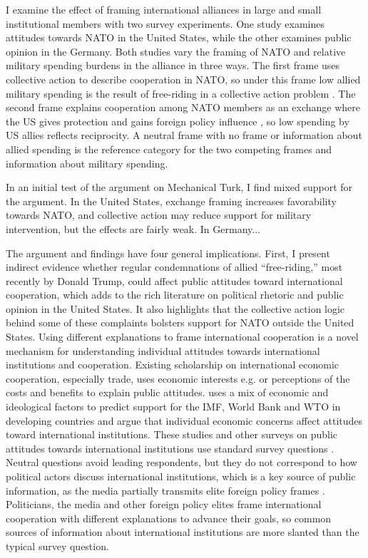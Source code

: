 \documentclass[12pt]{article}
\begin{document}
I examine the effect of framing international alliances in large and small institutional members with two survey experiments. 
One study examines attitudes towards NATO in the United States, while the other examines public opinion in the Germany. 
Both studies vary the framing of NATO and relative military spending burdens in the alliance in three ways. 
The first frame uses collective action to describe cooperation in NATO, so under this frame low allied military spending is the result of free-riding in a collective action problem \citep{OlsonZeckhauser1966}.
The second frame explains cooperation among NATO members as an exchange where the US gives protection and gains foreign policy influence \citep{Morrow1991}, so low spending by US allies reflects reciprocity. 
A neutral frame with no frame or information about allied spending is the reference category for the two competing frames and information about military spending.


In an initial test of the argument on Mechanical Turk, I find mixed support for the argument.
In the United States, exchange framing increases favorability towards NATO, and collective action may reduce support for military intervention, but the effects are fairly weak. 
In Germany... 


The argument and findings have four general implications.
First, I present indirect evidence whether regular condemnations of allied ``free-riding,'' most recently by Donald Trump, could affect public attitudes toward international cooperation, which adds to the rich literature on political rhetoric and public opinion in the United States. 
It also highlights that the collective action logic behind some of these complaints bolsters support for NATO outside the United States.  
Using different explanations to frame international cooperation is a novel mechanism for understanding individual attitudes towards international institutions and cooperation. 
Existing scholarship on international economic cooperation, especially trade, uses economic interests e.g. \citep{Rogowski1987, MaydaRodrik2005} or perceptions of the costs and benefits \citep{Hainmueller2006, MansfieldMutz2009, RhoTomz2017} to explain public attitudes. 
\citet{Edwards2009} uses a mix of economic and ideological factors to predict support for the IMF, World Bank and WTO in developing countries and \citet{BearceScott2019} argue that individual economic concerns affect attitudes toward international institutions. 
These studies and other surveys on public attitudes towards international institutions use standard survey questions \citep{KayaWalker2014, DellmuthTallberg2015}.
Neutral questions avoid leading respondents, but they do not correspond to how political actors discuss international institutions, which is a key source of public information, as the media partially transmits elite foreign policy frames \citep{BaumPotter2008}. 
Politicians, the media and other foreign policy elites frame international cooperation with different explanations to advance their goals, so common sources of information about international institutions are more slanted than the typical survey question.  
\end{document}
